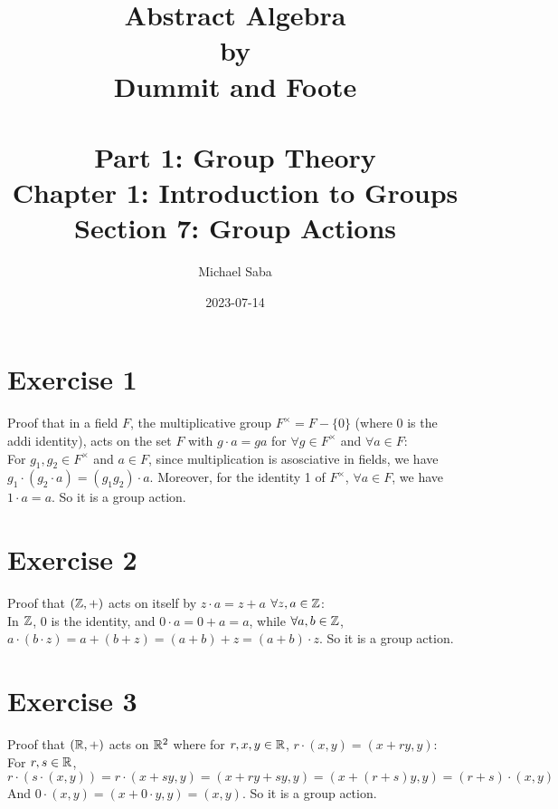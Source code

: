 \documentclass{article}
\title{%
    \Huge Abstract Algebra \\
    \large by \\
    \Large Dummit and Foote \\~\\
    \huge Part 1: Group Theory \\
    \LARGE Chapter 1: Introduction to Groups \\
    \Large Section 7: Group Actions
}
\date{2023-07-14}
\author{Michael Saba}
\begin{document}
    \maketitle
    \newpage
    \setlength{\parindent}{0pt}

    \section*{Exercise 1}
    Proof that in a field $F$, the multiplicative group
    $F^\times = F - \{0\}$ (where 0 is the addi identity),
    acts on the set $F$ with $g \cdot a = ga$ for $\forall g \in F^\times$
    and $\forall a \in F$: \\
    For $g_1, g_2 \in F^\times$ and $a \in F$,
    since multiplication is asosciative in fields,
    we have $g_1 \cdot (g_2 \cdot a) = (g_1g_2) \cdot a$.
    Moreover, for the identity 1 of $F^\times$,
    $\forall a \in F$, we have $1 \cdot a = a$.
    So it is a group action.


    \section*{Exercise 2}
    Proof that $(\mathbb{Z}, +)$ acts on itself by $z \cdot a = z + a$
    $\forall z, a \in \mathbb{Z}$: \\
    In $\mathbb{Z}$, 0 is the identity, and $0 \cdot a = 0 + a = a$,
    while $\forall a, b \in \mathbb{Z}$,
    $a \cdot (b \cdot z) = a + (b + z) = (a + b) + z = (a + b) \cdot z$.
    So it is a group action.


    \section*{Exercise 3}
    Proof that $(\mathbb{R}, +)$ acts on $\mathbb{R}^2$
    where for $r, x, y \in \mathbb{R}$, $r \cdot (x, y) = (x + ry, y)$: \\
    For $r, s \in \mathbb{R}$,
    $r \cdot (s \cdot (x, y)) = r \cdot (x + sy, y)
    = (x + ry + sy, y)
    = (x + (r + s)y, y)
    = (r + s) \cdot (x, y)$
    And $0 \cdot (x, y) = (x + 0 \cdot y, y) = (x, y)$.
    So it is a group action.
\end{document}
